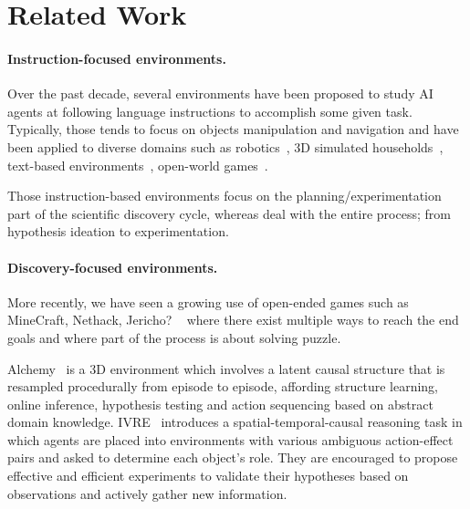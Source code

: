 \section{Related Work}


\paragraph{Instruction-focused environments.} Over the past decade, several environments have been proposed to study AI agents at following language instructions to accomplish some given task. Typically, those tends to focus on objects manipulation and navigation and have been applied to diverse domains such as robotics~\citep{yu2021metaworld,yang2023unisim}, 3D simulated households~\citep{Kolve2017AI2THORAI,ALFRED20,Szot2021Habitat2T,HoME}, text-based environments~\cite{Ct2018TextWorldAL,Shridhar2020ALFWorldAT,wang2022scienceworld,tamari-etal-2021-process}, open-world games~\citep{fan2022minedojo, MineRL}.

Those instruction-based environments focus on the planning/experimentation part of the scientific discovery cycle, whereas \env deal with the entire process; from hypothesis ideation to experimentation.

\paragraph{Discovery-focused environments.} More recently, we have seen a growing use of open-ended games such as MineCraft, Nethack, Jericho? ~\citep{fan2022minedojo, MineRL, Jericho} where there exist multiple ways to reach the end goals and where part of the process is about solving puzzle.

Alchemy~\citep{wang2021alchemy} is a 3D environment which involves a latent causal structure that is resampled procedurally from episode to episode, affording structure learning, online inference, hypothesis testing and action sequencing based on abstract domain knowledge.
IVRE~\citep{xu2023interactive} introduces a spatial-temporal-causal reasoning task in which agents are placed into environments with various ambiguous action-effect pairs and asked to determine each object’s role. They are encouraged to propose effective and efficient experiments to validate their hypotheses based on observations and actively gather new information.




